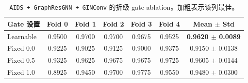 \begin{table}[t]
\centering
\scriptsize
\setlength{\tabcolsep}{3.5pt}
\caption{\texttt{AIDS + GraphResGNN + GINConv} 的折级 gate ablation。加粗表示该列最佳。}
\label{tab:aids_gate_ablation_folds}
\begin{tabular}{lcccccc}
\toprule
Gate 设置 & Fold 0 & Fold 1 & Fold 2 & Fold 3 & Fold 4 & Mean $\pm$ Std \\
\midrule
Learnable & 0.9500 & 0.9700 & 0.9700 & 0.9675 & 0.9525 & \textbf{0.9620 $\pm$ 0.0089} \\
Fixed 0.0 & 0.9225 & 0.9025 & 0.9125 & 0.9000 & 0.9375 & 0.9150 $\pm$ 0.0138 \\
Fixed 0.5 & 0.9325 & 0.9625 & 0.9675 & 0.9675 & 0.9725 & 0.9605 $\pm$ 0.0144 \\
Fixed 1.0 & 0.8925 & 0.9450 & 0.9700 & 0.9775 & 0.9550 & 0.9480 $\pm$ 0.0300 \\
\bottomrule
\end{tabular}
\end{table}
